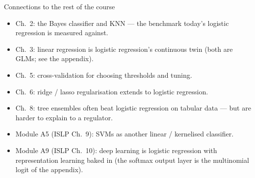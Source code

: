 \documentclass[aspectratio=169,11pt]{beamer}
\begin{document}
\begin{frame}{Connections to the rest of the course}
  \begin{itemize}
    \item Ch.~2: the Bayes classifier and KNN --- the benchmark today's
          logistic regression is measured against.
    \item Ch.~3: linear regression is logistic regression's continuous
          twin (both are GLMs; see the appendix).
    \item Ch.~5: cross-validation for choosing thresholds and tuning.
    \item Ch.~6: ridge / lasso regularisation extends to logistic
          regression.
    \item Ch.~8: tree ensembles often beat logistic regression on
          tabular data --- but are harder to explain to a regulator.
    \item Module A5 (ISLP Ch.~9): SVMs as another linear / kernelised classifier.
    \item Module A9 (ISLP Ch.~10): deep learning is logistic regression with
          representation learning baked in (the softmax output layer is
          the multinomial logit of the appendix).
  \end{itemize}
\end{frame}
\end{document}
